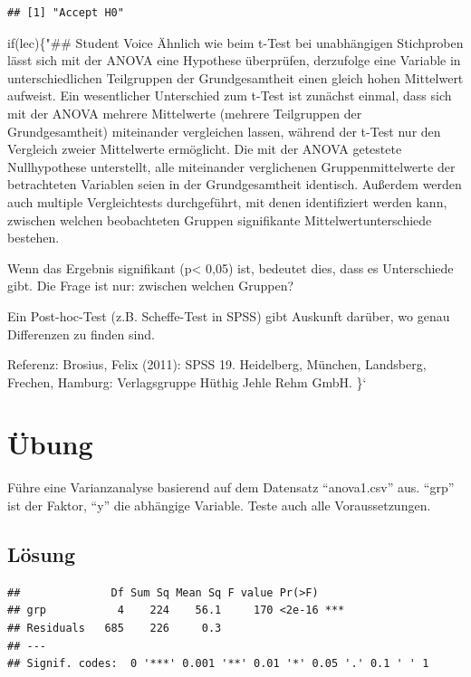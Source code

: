 \documentclass[
]{book}
\begin{document}
\begin{verbatim}
## [1] "Accept H0"
\end{verbatim}

if(lec)\{"\#\# Student Voice
Ähnlich wie beim t-Test bei unabhängigen Stichproben lässt sich mit der ANOVA eine Hypothese überprüfen, derzufolge eine Variable in unterschiedlichen Teilgruppen der Grundgesamtheit einen gleich hohen Mittelwert aufweist. Ein wesentlicher Unterschied zum t-Test ist zunächst einmal, dass sich mit der ANOVA mehrere Mittelwerte (mehrere Teilgruppen der Grundgesamtheit) miteinander vergleichen lassen, während der t-Test nur den Vergleich zweier Mittelwerte ermöglicht. Die mit der ANOVA getestete Nullhypothese unterstellt, alle miteinander verglichenen Gruppenmittelwerte der betrachteten Variablen seien in der Grundgesamtheit identisch. Außerdem werden auch multiple Vergleichtests durchgeführt, mit denen identifiziert werden kann, zwischen welchen beobachteten Gruppen signifikante Mittelwertunterschiede bestehen.

Wenn das Ergebnis signifikant (p\textless{} 0,05) ist, bedeutet dies, dass es Unterschiede gibt. Die Frage ist nur: zwischen welchen Gruppen?

Ein Post-hoc-Test (z.B. Scheffe-Test in SPSS) gibt Auskunft darüber, wo genau Differenzen zu finden sind.

Referenz: Brosius, Felix (2011): SPSS 19. Heidelberg, München, Landsberg, Frechen, Hamburg: Verlagsgruppe Hüthig Jehle Rehm GmbH.
\}`

\hypertarget{uxfcbung-1}{%
\section{Übung}\label{uxfcbung-1}}

Führe eine Varianzanalyse basierend auf dem Datensatz ``anova1.csv'' aus. ``grp'' ist der Faktor, ``y'' die abhängige Variable. Teste auch alle Voraussetzungen.

\hypertarget{luxf6sung-4}{%
\subsection{Lösung}\label{luxf6sung-4}}

\begin{verbatim}
##              Df Sum Sq Mean Sq F value Pr(>F)    
## grp           4    224    56.1     170 <2e-16 ***
## Residuals   685    226     0.3                   
## ---
## Signif. codes:  0 '***' 0.001 '**' 0.01 '*' 0.05 '.' 0.1 ' ' 1
\end{verbatim}
\end{document}
